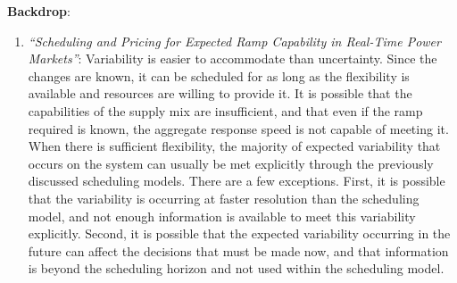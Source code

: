 \newpage
{\bf Backdrop}: 
\begin{enumerate}
\item {\it ``Scheduling and Pricing for Expected Ramp Capability in Real-Time Power Markets''}: Variability is easier to accommodate than uncertainty. Since the changes are known, it can be scheduled for as long as the flexibility is available and resources are willing to provide it. It is possible that the capabilities of the supply mix are insufficient, and that even if the ramp required is known, the aggregate response speed is not capable of meeting it. When there is sufficient flexibility, the majority of expected variability that occurs on the system can usually be met explicitly through the previously discussed scheduling models. There are a few exceptions. First, it is possible that the variability is occurring at faster resolution than the scheduling model, and not enough information is available to meet this variability explicitly. Second, it is possible that the expected variability occurring in the future can affect the decisions that must be made now, and that information
is beyond the scheduling horizon and not used within the scheduling model. 
\end{enumerate}


